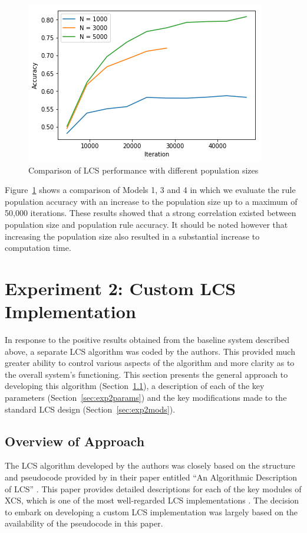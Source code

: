 \documentclass[11pt]{article}
\begin{document}
\begin{figure}[!htbp]
	\centering
	\includegraphics[width=0.5\linewidth]{figures/bs-plot-2.png}
	\caption{Comparison of LCS performance with different population sizes}
	\label{fig:diffPopSize}
\end{figure}

Figure~\ref{fig:diffPopSize} shows a comparison of Models 1, 3 and 4 in which we evaluate the rule population accuracy with an increase to the population size up to a maximum of 50,000 iterations. These results showed that a strong correlation existed between population size and population rule accuracy. It should be noted however that increasing the population size also resulted in a substantial increase to computation time.

\pagebreak
\section{Experiment 2: Custom LCS Implementation}
\label{sec:exp2}

In response to the positive results obtained from the baseline system described above, a separate LCS algorithm was coded by the authors. This provided much greater ability to control various aspects of the algorithm and more clarity as to the overall system's functioning. This section presents the general approach to developing this algorithm (Section~\ref{sec:exp2appr}), a description of each of the key parameters (Section~\ref{sec:exp2params}) and the key modifications made to the standard LCS design (Section~\ref{sec:exp2mods}).

\subsection{Overview of Approach}
\label{sec:exp2appr}

The LCS algorithm developed by the authors was closely based on the structure and pseudocode provided by \citeauthor{Butz2000} in their paper entitled ``An Algorithmic Description of LCS'' \cite{Butz2000}. This paper provides detailed descriptions for each of the key modules of XCS, which is one of the most well-regarded LCS implementations \cite{Sigaud2007}. The decision to embark on developing a custom LCS implementation was largely based on the availability of the pseudocode in this paper.
\end{document}
